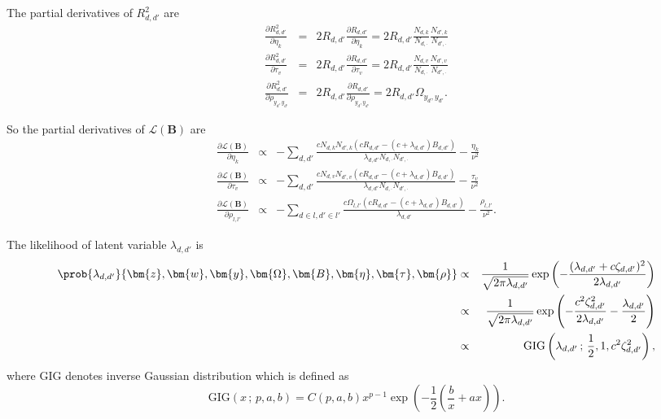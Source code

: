The partial derivatives of $R_{d,d'}^2$ are
\begin{eqnarray}
\frac {\partial R_{d,d'}^2} {\partial \eta_k} &=& 2R_{d,d'} \frac {\partial R_{d,d'}} {\partial \eta_k} = 2R_{d,d'} \frac {N_{d,k}} {N_{d,\cdot}} \frac {N_{d',k}} {N_{d',\cdot}}\\
\frac {\partial R_{d,d'}^2} {\partial \tau_v} &=& 2R_{d,d'} \frac {\partial R_{d,d'}} {\partial \tau_v} = 2R_{d,d'} \frac {N_{d,v}} {N_{d,\cdot}} \frac {N_{d',v}} {N_{d',\cdot}}\\
\frac {\partial R_{d,d'}^2} {\partial \rho_{y_d, y_{d'}}} &=& 2R_{d,d'} \frac {\partial R_{d,d'}} {\partial \rho_{y_d, y_{d'}}} = 2R_{d,d'} \Omega_{y_d, y_{d'}}.
\end{eqnarray}

So the partial derivatives of $\mathcal{L}(\bm{B})$ are
\begin{eqnarray}
\frac {\partial \mathcal{L}(\bm{B})} {\partial \eta_k} &\propto& -\sum_{d,d'} \frac {c N_{d,k} N_{d',k} (cR_{d,d'} - (c + \lambda_{d,d'}) B_{d,d'})} {\lambda_{d,d'} N_{d,\cdot} N_{d',\cdot}} - \frac {\eta_k} {\nu^2} \label{eq:hinge_eta}\\
\frac {\partial \mathcal{L}(\bm{B})} {\partial \tau_v} &\propto& -\sum_{d,d'} \frac {c N_{d,v} N_{d',v} (cR_{d,d'} - (c + \lambda_{d,d'}) B_{d,d'})} {\lambda_{d,d'} N_{d,\cdot} N_{d',\cdot}} - \frac {\tau_v} {\nu^2} \label{eq:hinge_tau}\\
\frac {\partial \mathcal{L}(\bm{B})} {\partial \rho_{l,l'}} &\propto& -\sum_{d\in l,d'\in l'} \frac {c \Omega_{l,l'} (cR_{d,d'} - (c + \lambda_{d,d'}) B_{d,d'})} {\lambda_{d,d'}} - \frac {\rho_{l,l'}} {\nu^2}. \label{eq:hinge_rho}
\end{eqnarray}

The likelihood of latent variable $\lambda_{d,d'}$ is
\begin{eqnarray}
\prob {\lambda_{d,d'}} {\bm{z}, \bm{w}, \bm{y}, \bm{\Omega}, \bm{B}, \bm{\eta}, \bm{\tau}, \bm{\rho}} &\propto& \frac {1} {\sqrt{2\pi \lambda_{d,d'}}} \exp \left( -\frac {(\lambda_{d,d'} + c\zeta_{d,d'})^2} {2\lambda_{d,d'}} \right)\\
&\propto& \frac {1} {\sqrt{2\pi \lambda_{d,d'}}} \exp \left( -\frac {c^2 \zeta_{d,d'}^2} {2\lambda_{d,d'}} - \frac {\lambda_{d,d'}} {2} \right)\\
&\propto& \mathrm{GIG} \left( \lambda_{d,d'} \,;\, \frac{1}{2}, 1, c^2 \zeta_{d,d'}^2 \right),
\end{eqnarray}
where GIG denotes inverse Gaussian distribution which is defined as
\begin{equation}
\mathrm{GIG} (x \,;\, p, a, b) = C(p, a, b) x^{p-1} \exp \left( -\frac{1}{2} \left( \frac{b}{x} + ax \right) \right).
\end{equation}

